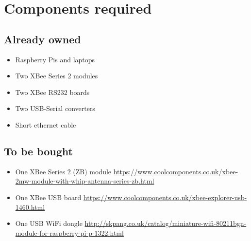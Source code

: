 \documentclass[a4paper,12pt]{article}
\begin{document}
\section{Components required}

\subsection{Already owned}

\begin{itemize}
  \item Raspberry Pis and laptops
  \item Two XBee Series 2 modules
  \item Two XBee RS232 boards
  \item Two USB-Serial converters
  \item Short ethernet cable
\end{itemize}

\subsection{To be bought}

\begin{itemize}
  \item One XBee Series 2 (ZB) module \url{https://www.coolcomponents.co.uk/xbee-2mw-module-with-whip-antenna-series-zb.html}
  \item One XBee USB board \url{https://www.coolcomponents.co.uk/xbee-explorer-usb-1460.html}
  \item One USB WiFi dongle \url{http://skpang.co.uk/catalog/miniature-wifi-80211bgn-module-for-raspberry-pi-p-1322.html}
\end{itemize}
\end{document}
